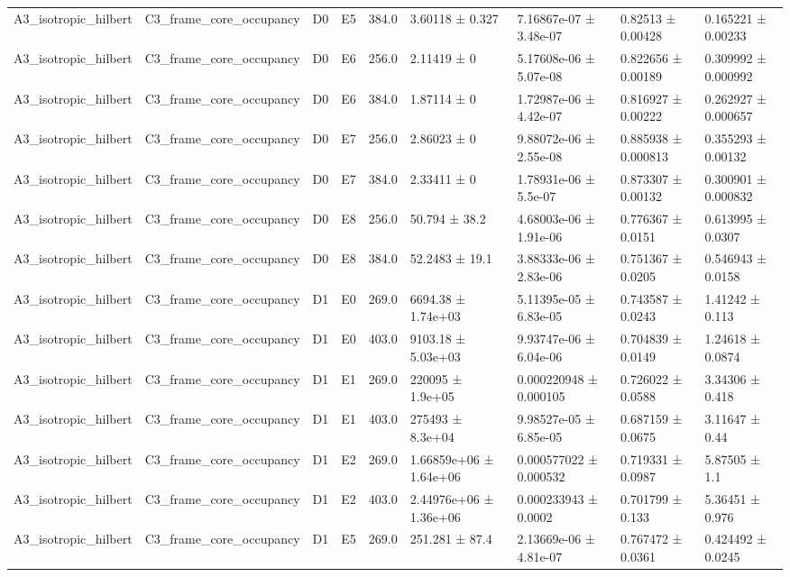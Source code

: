 \begin{table}
\begin{tabular}{lllllllll}
A3\_isotropic\_hilbert & C3\_frame\_core\_occupancy & D0 & E5 & 384.0 & 3.60118 ± 0.327 & 7.16867e-07 ± 3.48e-07 & 0.82513 ± 0.00428 & 0.165221 ± 0.00233 \\
A3\_isotropic\_hilbert & C3\_frame\_core\_occupancy & D0 & E6 & 256.0 & 2.11419 ± 0 & 5.17608e-06 ± 5.07e-08 & 0.822656 ± 0.00189 & 0.309992 ± 0.000992 \\
A3\_isotropic\_hilbert & C3\_frame\_core\_occupancy & D0 & E6 & 384.0 & 1.87114 ± 0 & 1.72987e-06 ± 4.42e-07 & 0.816927 ± 0.00222 & 0.262927 ± 0.000657 \\
A3\_isotropic\_hilbert & C3\_frame\_core\_occupancy & D0 & E7 & 256.0 & 2.86023 ± 0 & 9.88072e-06 ± 2.55e-08 & 0.885938 ± 0.000813 & 0.355293 ± 0.00132 \\
A3\_isotropic\_hilbert & C3\_frame\_core\_occupancy & D0 & E7 & 384.0 & 2.33411 ± 0 & 1.78931e-06 ± 5.5e-07 & 0.873307 ± 0.00132 & 0.300901 ± 0.000832 \\
A3\_isotropic\_hilbert & C3\_frame\_core\_occupancy & D0 & E8 & 256.0 & 50.794 ± 38.2 & 4.68003e-06 ± 1.91e-06 & 0.776367 ± 0.0151 & 0.613995 ± 0.0307 \\
A3\_isotropic\_hilbert & C3\_frame\_core\_occupancy & D0 & E8 & 384.0 & 52.2483 ± 19.1 & 3.88333e-06 ± 2.83e-06 & 0.751367 ± 0.0205 & 0.546943 ± 0.0158 \\
A3\_isotropic\_hilbert & C3\_frame\_core\_occupancy & D1 & E0 & 269.0 & 6694.38 ± 1.74e+03 & 5.11395e-05 ± 6.83e-05 & 0.743587 ± 0.0243 & 1.41242 ± 0.113 \\
A3\_isotropic\_hilbert & C3\_frame\_core\_occupancy & D1 & E0 & 403.0 & 9103.18 ± 5.03e+03 & 9.93747e-06 ± 6.04e-06 & 0.704839 ± 0.0149 & 1.24618 ± 0.0874 \\
A3\_isotropic\_hilbert & C3\_frame\_core\_occupancy & D1 & E1 & 269.0 & 220095 ± 1.9e+05 & 0.000220948 ± 0.000105 & 0.726022 ± 0.0588 & 3.34306 ± 0.418 \\
A3\_isotropic\_hilbert & C3\_frame\_core\_occupancy & D1 & E1 & 403.0 & 275493 ± 8.3e+04 & 9.98527e-05 ± 6.85e-05 & 0.687159 ± 0.0675 & 3.11647 ± 0.44 \\
A3\_isotropic\_hilbert & C3\_frame\_core\_occupancy & D1 & E2 & 269.0 & 1.66859e+06 ± 1.64e+06 & 0.000577022 ± 0.000532 & 0.719331 ± 0.0987 & 5.87505 ± 1.1 \\
A3\_isotropic\_hilbert & C3\_frame\_core\_occupancy & D1 & E2 & 403.0 & 2.44976e+06 ± 1.36e+06 & 0.000233943 ± 0.0002 & 0.701799 ± 0.133 & 5.36451 ± 0.976 \\
A3\_isotropic\_hilbert & C3\_frame\_core\_occupancy & D1 & E5 & 269.0 & 251.281 ± 87.4 & 2.13669e-06 ± 4.81e-07 & 0.767472 ± 0.0361 & 0.424492 ± 0.0245 \\

\end{tabular}
\end{table}
